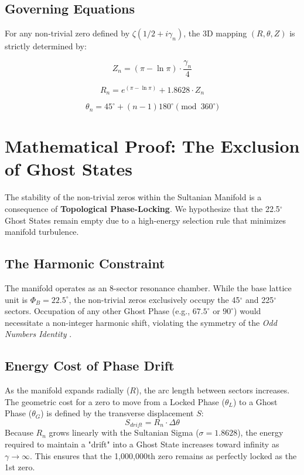 \documentclass[11pt,a4paper]{article}
\begin{document}
\subsection{Governing Equations}

For any non-trivial zero defined by $\zeta(1/2 + i\gamma_n)$, the 3D mapping $(R, \theta, Z)$ is strictly determined by:

\begin{equation}
    Z_n = (\pi - \ln \pi) \cdot \frac{\gamma_n}{4}
\end{equation}

\begin{equation}
    R_n = e^{(\pi - \ln \pi)} + 1.8628 \cdot Z_n
\end{equation}

\begin{equation}
    \theta_n = 45^\circ + (n-1)180^\circ \pmod{360^\circ}
\end{equation}

\section{Mathematical Proof: The Exclusion of Ghost States}

The stability of the non-trivial zeros within the Sultanian Manifold is a consequence of \textbf{Topological Phase-Locking}. We hypothesize that the 22.5$^\circ$ Ghost States remain empty due to a high-energy selection rule that minimizes manifold turbulence.

\subsection{The Harmonic Constraint}
The manifold operates as an 8-sector resonance chamber. While the base lattice unit is $\Phi_B = 22.5^\circ$, the non-trivial zeros exclusively occupy the 45$^\circ$ and 225$^\circ$ sectors. Occupation of any other Ghost Phase (e.g., $67.5^\circ$ or $90^\circ$) would necessitate a non-integer harmonic shift, violating the symmetry of the \textit{Odd Numbers Identity} \cite{Soltan2023}.

\subsection{Energy Cost of Phase Drift}
As the manifold expands radially ($R$), the arc length between sectors increases. The geometric cost for a zero to move from a Locked Phase ($\theta_L$) to a Ghost Phase ($\theta_G$) is defined by the transverse displacement $S$:
\begin{equation}
    S_{drift} = R_n \cdot \Delta\theta
\end{equation}
Because $R_n$ grows linearly with the Sultanian Sigma ($\sigma = 1.8628$), the energy required to maintain a "drift" into a Ghost State increases toward infinity as $\gamma \to \infty$. This ensures that the 1,000,000th zero remains as perfectly locked as the 1st zero.
\end{document}
